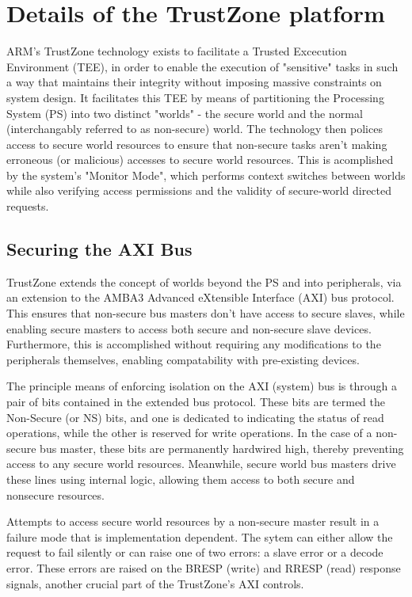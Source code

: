 \documentclass[journal]{IEEEtran}
\begin{document}
\section{Details of the TrustZone platform}
ARM's TrustZone technology exists to facilitate a Trusted Excecution Environment (TEE), in
order to enable the execution of "sensitive" tasks in such a way that maintains their
integrity without imposing massive constraints on system design. It facilitates this TEE
by means of partitioning the Processing System (PS) into two distinct "worlds" - the
secure world and the normal (interchangably referred to as non-secure) world. The
technology then polices access to secure world resources to ensure that non-secure tasks
aren't making erroneous (or malicious) accesses to secure world resources. This is
acomplished by the system's "Monitor Mode", which performs context switches between worlds
while also verifying access permissions and the validity of secure-world directed requests.

\subsection{Securing the AXI Bus}
TrustZone extends the concept of worlds beyond the PS and into peripherals,
via an extension to the AMBA3 Advanced eXtensible Interface (AXI) bus protocol. This
ensures that non-secure bus masters don't have access to secure slaves, while enabling
secure masters to access both secure and non-secure slave devices. Furthermore, this is
accomplished without requiring any modifications to the peripherals themselves, enabling
compatability with pre-existing devices.

The principle means of enforcing isolation on the AXI (system) bus is through a pair of
bits contained in the extended bus protocol. These bits are termed the Non-Secure (or NS)
bits, and one is dedicated to indicating the status of read operations, while the other is
reserved for write operations.\cite{benhani_security_2019} In the case of a non-secure bus
master, these bits are permanently hardwired high, thereby preventing access to any 
secure world resources. Meanwhile, secure world bus masters drive these lines using 
internal logic, allowing them access to both secure and nonsecure resources.

Attempts to access secure world resources by a non-secure master result in a failure mode
that is implementation dependent. The sytem can either allow the request to fail silently
or can raise one of two errors: a slave error or a decode error. These errors are raised
on the BRESP (write) and RRESP (read) response signals, another crucial part of the 
TrustZone's AXI controls. \cite{benhani_security_2017}
\end{document}
